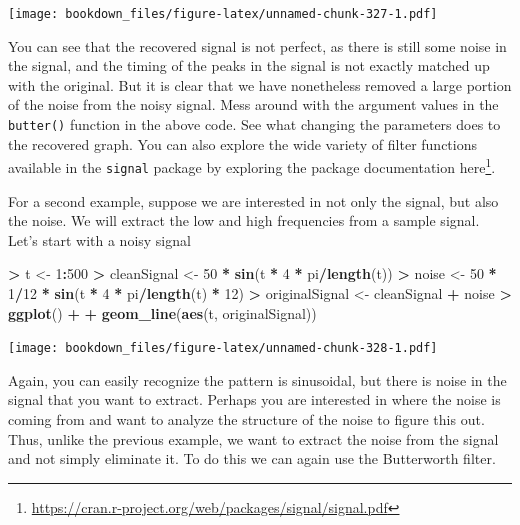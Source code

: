 \documentclass[]{krantz}
\makeatletter
\newenvironment{Shaded}{\begin{snugshade}}{\end{snugshade}}
\newcommand{\KeywordTok}[1]{\textcolor[rgb]{0.27,0.27,0.27}{\textbf{#1}}}
\newcommand{\DecValTok}[1]{\textcolor[rgb]{0.06,0.06,0.06}{#1}}
\newcommand{\StringTok}[1]{\textcolor[rgb]{0.5,0.5,0.5}{#1}}
\newcommand{\OperatorTok}[1]{\textcolor[rgb]{0.43,0.43,0.43}{\textbf{#1}}}
\newcommand{\NormalTok}[1]{#1}
\renewcommand{\href}[2]{#2\footnote{\url{#1}}}
\newenvironment{kframe}{%
\medskip{}
\setlength{\fboxsep}{.8em}
 \def\at@end@of@kframe{}%
 \ifinner\ifhmode%
  \def\at@end@of@kframe{\end{minipage}}%
  \begin{minipage}{\columnwidth}%
 \fi\fi%
 \def\FrameCommand##1{\hskip\@totalleftmargin \hskip-\fboxsep
 \colorbox{shadecolor}{##1}\hskip-\fboxsep
     \hskip-\linewidth \hskip-\@totalleftmargin \hskip\columnwidth}%
 \MakeFramed {\advance\hsize-\width
   \@totalleftmargin\z@ \linewidth\hsize
   \@setminipage}}%
 {\par\unskip\endMakeFramed%
 \at@end@of@kframe}
\renewenvironment{Shaded}{\begin{kframe}}{\end{kframe}}
\makeatother
\begin{document}
\texttt{[image: bookdown\_files/figure-latex/unnamed-chunk-327-1.pdf]}

You can see that the recovered signal is not perfect, as there is still
some noise in the signal, and the timing of the peaks in the signal is
not exactly matched up with the original. But it is clear that we have
nonetheless removed a large portion of the noise from the noisy signal.
Mess around with the argument values in the \texttt{butter()} function
in the above code. See what changing the parameters does to the
recovered graph. You can also explore the wide variety of filter
functions available in the \texttt{signal} package by exploring the
package documentation
\href{https://cran.r-project.org/web/packages/signal/signal.pdf}{here}.

For a second example, suppose we are interested in not only the signal,
but also the noise. We will extract the low and high frequencies from a
sample signal. Let's start with a noisy signal

\begin{Shaded}
\begin{Highlighting}[]
\OperatorTok{>}\StringTok{ }\NormalTok{t <-}\StringTok{ }\DecValTok{1}\OperatorTok{:}\DecValTok{500}
\OperatorTok{>}\StringTok{ }\NormalTok{cleanSignal <-}\StringTok{ }\DecValTok{50} \OperatorTok{*}\StringTok{ }\KeywordTok{sin}\NormalTok{(t }\OperatorTok{*}\StringTok{ }\DecValTok{4} \OperatorTok{*}\StringTok{ }\NormalTok{pi}\OperatorTok{/}\KeywordTok{length}\NormalTok{(t))}
\OperatorTok{>}\StringTok{ }\NormalTok{noise <-}\StringTok{ }\DecValTok{50} \OperatorTok{*}\StringTok{ }\DecValTok{1}\OperatorTok{/}\DecValTok{12} \OperatorTok{*}\StringTok{ }\KeywordTok{sin}\NormalTok{(t }\OperatorTok{*}\StringTok{ }\DecValTok{4} \OperatorTok{*}\StringTok{ }\NormalTok{pi}\OperatorTok{/}\KeywordTok{length}\NormalTok{(t) }\OperatorTok{*}\StringTok{ }\DecValTok{12}\NormalTok{)}
\OperatorTok{>}\StringTok{ }\NormalTok{originalSignal <-}\StringTok{ }\NormalTok{cleanSignal }\OperatorTok{+}\StringTok{ }\NormalTok{noise}
\OperatorTok{>}\StringTok{ }\KeywordTok{ggplot}\NormalTok{() }\OperatorTok{+}\StringTok{ }
\OperatorTok{+}\StringTok{   }\KeywordTok{geom_line}\NormalTok{(}\KeywordTok{aes}\NormalTok{(t, originalSignal))}
\end{Highlighting}
\end{Shaded}

\texttt{[image: bookdown\_files/figure-latex/unnamed-chunk-328-1.pdf]}

Again, you can easily recognize the pattern is sinusoidal, but there is
noise in the signal that you want to extract. Perhaps you are interested
in where the noise is coming from and want to analyze the structure of
the noise to figure this out. Thus, unlike the previous example, we want
to extract the noise from the signal and not simply eliminate it. To do
this we can again use the Butterworth filter.
\end{document}
